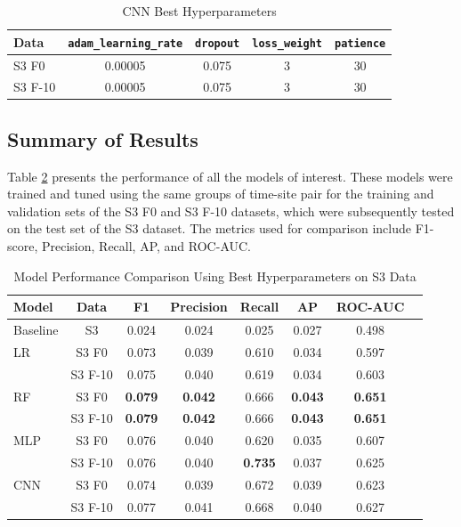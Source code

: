 \documentclass[a4paper,11pt]{report}
\begin{document}
\begin{table}[H]
    \begin{subtable}{\linewidth}
        \centering
        \caption{CNN Best Hyperparameters}
        \label{tab:cnn_best_hyperparamters}
        \begin{tabular}{lcccc}
        \toprule
        \textbf{Data} & \verb|adam_learning_rate| & \verb|dropout| & \verb|loss_weight| & \verb|patience| \\
        \midrule
        S3 F0 & 0.00005 & 0.075 & 3 & 30  \\
        S3 F-10 & 0.00005 & 0.075 & 3 & 30  \\ \bottomrule
        \end{tabular}
    \end{subtable}
    \label{tab:best_hyper}
\end{table}
    
\subsection{Summary of Results}


Table \ref{tab:all_hyperparameter_results} presents the performance of all the models of interest. These models were trained and tuned using the same groups of time-site pair for the training and validation sets of the S3 F0 and S3 F-10 datasets, which were subsequently tested on the test set of the S3 dataset. The metrics used for comparison include F1-score, Precision, Recall, AP, and ROC-AUC.

\begin{table}[h]
    \caption{Model Performance Comparison Using Best Hyperparameters on S3 Data}
    \label{tab:all_hyperparameter_results}
    \centering
    \begin{tabular}{lccccccc}
    \toprule
    \textbf{Model} & \textbf{Data} & \textbf{F1} & \textbf{Precision} & \textbf{Recall} & \textbf{AP} & \textbf{ROC-AUC}  \\
    \midrule
    Baseline & S3 & 0.024 & 0.024 & 0.025 & 0.027 & 0.498 \\ \midrule
    LR & S3 F0 & 0.073 & 0.039 & 0.610 & 0.034 & 0.597  \\
     & S3 F-10 & 0.075 & 0.040 & 0.619 & 0.034 & 0.603 \\ \midrule
    RF & S3 F0 & \textbf{0.079} & \textbf{0.042} & 0.666 & \textbf{0.043} & \textbf{0.651}    \\
     & S3 F-10 & \textbf{0.079} & \textbf{0.042} & 0.666 & \textbf{0.043} & \textbf{0.651}   \\ \midrule
    MLP & S3 F0 & 0.076 & 0.040 & 0.620 & 0.035 & 0.607  \\
     & S3 F-10 & 0.076 & 0.040 & \textbf{0.735} & 0.037 & 0.625   \\ \midrule
    CNN & S3 F0 & 0.074 & 0.039 & 0.672 & 0.039 & 0.623   \\
     & S3 F-10 & 0.077 & 0.041 & 0.668 & 0.040 & 0.627   \\ \bottomrule
    \end{tabular}
\end{table}
\end{document}
